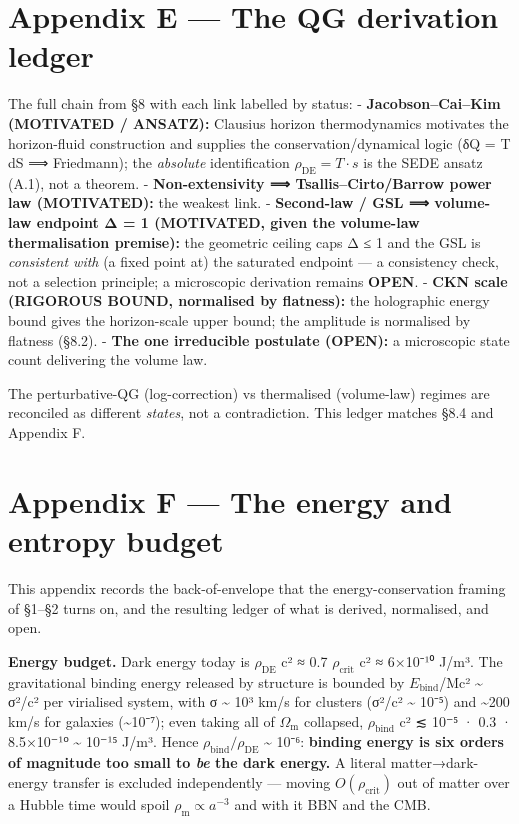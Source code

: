 \documentclass[
  10pt,
]{article}
\begin{document}
\section{Appendix E --- The QG derivation
ledger}\label{appendix-e-the-qg-derivation-ledger}

The full chain from §8 with each link labelled by status: -
\textbf{Jacobson--Cai--Kim (MOTIVATED / ANSATZ):} Clausius horizon
thermodynamics motivates the horizon-fluid construction and supplies the
conservation/dynamical logic (δQ = T dS ⟹ Friedmann); the
\emph{absolute} identification \(\rho _{\mathrm{DE}} = T\cdot s\) is the
SEDE ansatz (A.1), not a theorem. - \textbf{Non-extensivity ⟹
Tsallis--Cirto/Barrow power law (MOTIVATED):} the weakest link. -
\textbf{Second-law / GSL ⟹ volume-law endpoint Δ = 1 (MOTIVATED, given
the volume-law thermalisation premise):} the geometric ceiling caps Δ ≤
1 and the GSL is \emph{consistent with} (a fixed point at) the saturated
endpoint --- a consistency check, not a selection principle; a
microscopic derivation remains \textbf{OPEN}. - \textbf{CKN scale
(RIGOROUS BOUND, normalised by flatness):} the holographic energy bound
gives the horizon-scale upper bound; the amplitude is normalised by
flatness (§8.2). - \textbf{The one irreducible postulate (OPEN):} a
microscopic state count delivering the volume law.

The perturbative-QG (log-correction) vs thermalised (volume-law) regimes
are reconciled as different \emph{states}, not a contradiction. This
ledger matches §8.4 and Appendix F.

\section{Appendix F --- The energy and entropy
budget}\label{appendix-f-the-energy-and-entropy-budget}

This appendix records the back-of-envelope that the energy-conservation
framing of §1--§2 turns on, and the resulting ledger of what is derived,
normalised, and open.

\textbf{Energy budget.} Dark energy today is \(\rho _{\mathrm{DE}}\) c²
≈ 0.7 \(\rho _{\mathrm{crit}}\) c² ≈ 6×10⁻¹⁰ J/m³. The gravitational
binding energy released by structure is bounded by
\textbar{}\(E_{\mathrm{bind}}\)\textbar/Mc² \textasciitilde{} σ²/c² per
virialised system, with σ \textasciitilde{} 10³ km/s for clusters (σ²/c²
\textasciitilde{} 10⁻⁵) and \textasciitilde200 km/s for galaxies
(\textasciitilde10⁻⁷); even taking all of \(\Omega _{\mathrm{m}}\)
collapsed, \(\rho _{\mathrm{bind}}\) c² ≲ 10⁻⁵ · 0.3 · 8.5×10⁻¹⁰
\textasciitilde{} 10⁻¹⁵ J/m³. Hence
\(\rho _{\mathrm{bind}}/\rho _{\mathrm{DE}}\) \textasciitilde{} 10⁻⁶:
\textbf{binding energy is six orders of magnitude too small to \emph{be}
the dark energy.} A literal matter→dark-energy transfer is excluded
independently --- moving \(O(\rho _{\mathrm{crit}})\) out of matter over
a Hubble time would spoil \(\rho _{\mathrm{m}} \propto  a^{-3}\) and
with it BBN and the CMB.
\end{document}
